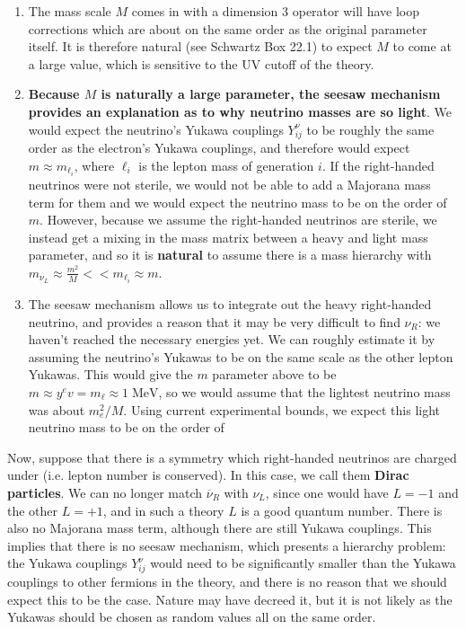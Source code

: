 \documentclass[11pt, oneside]{article}   	%
\theoremstyle{definition}
\numberwithin{equation}{subsection}		%
\begin{document}
\begin{enumerate}
	\item The mass scale $M$ comes in with a dimension 3 operator will have loop corrections which are about on the same order as the 
	original parameter itself. It is therefore natural (see Schwartz Box 22.1) to expect $M$ to come at a large value, which is 
	sensitive to the UV cutoff of the theory.
	\item \textbf{Because $M$ is naturally a large parameter, the seesaw mechanism provides an explanation as to why neutrino masses 
	are so light}. We would expect the neutrino's Yukawa couplings $Y_{ij}^\nu$ to be roughly the same order as the electron's Yukawa 
	couplings, and therefore would expect $m\approx m_{\ell_i}$, where $\ell_i$ is the lepton mass of generation $i$. If the right-handed 
	neutrinos were not sterile, we would not be able to add a Majorana mass term for them and we would expect the neutrino mass 
	to be on the order of $m$. However, because we assume the right-handed neutrinos are sterile, we instead get a mixing in the 
	mass matrix between a heavy and light mass parameter, and so it is \textbf{natural} to assume there is a mass hierarchy with 
	$m_{\nu_L}\approx \frac{m^2}{M} << m_{\ell_i}\approx m$. 
	\item The seesaw mechanism allows us to integrate out the heavy right-handed neutrino, and provides a reason that it may be 
	very difficult to find $\nu_R$: we haven't reached the necessary energies yet. We can roughly estimate it by assuming the neutrino's 
	Yukawas to be on the same scale as the other lepton Yukawas. This would give the $m$ parameter above to be $m\approx 
	y^e v = m_\ell\approx 1\;\mathrm{MeV}$, so we would assume that the lightest neutrino mass was about $m_e^2 / M$. 
	Using current experimental bounds, we expect this light neutrino mass to be on the order of 
\end{enumerate}

Now, suppose that there is a symmetry which right-handed neutrinos are charged under (i.e. lepton number is conserved). 
In this case, we call them \textbf{Dirac particles}. We can no longer match $\overline\nu_R$ with $\nu_L$, since one would 
have $L = -1$ and the other $L = +1$, and in such a theory $L$ is a good quantum number. There is also no Majorana mass term, 
although there are still Yukawa couplings. This implies that there is no seesaw mechanism, which presents a 
hierarchy problem: the Yukawa couplings $Y_{ij}^\nu$ would need to be significantly smaller than the Yukawa couplings to other 
fermions in the theory, and there is no reason that we should expect this to be the case. Nature may have decreed it, but it is 
not likely as the Yukawas should be chosen as random values all on the same order. 
\end{document}

